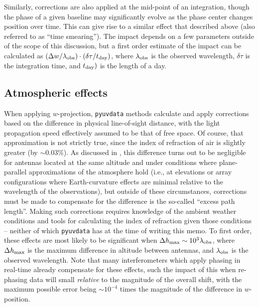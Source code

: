 \documentclass[11pt, oneside]{article}
\begin{document}
Similarly, corrections are also applied at the mid-point of an integration, though the phase of a given baseline may significantly evolve as the phase center changes position over time. This can give rise to a similar effect that described above (also referred to as ``time smearing''). The impact depends on a few parameters outside of the scope of this discussion, but a first order estimate of the impact can be calculated as $(\Delta w / \lambda_{\rm obs}) \cdot (\delta\tau / t_{\rm day})$, where $\lambda_{\rm obs}$ is the observed wavelength, $\delta\tau$ is the integration time, and $t_{\rm day})$ is the length of a day.

\subsection{Atmospheric effects}
When applying $w$-projection, \texttt{pyuvdata} methods calculate and apply corrections based on the difference in physical line-of-sight distance, with the light propagation speed effectively assumed to be that of free space. Of course, that approximation is not strictly true, since the index of refraction of air is slightly greater (by $\sim0.03\%$). As discussed in \cite{TMS}, this difference turns out to be negligible for antennas located at the same altitude and under conditions where plane-parallel approximations of the atmosphere hold (i.e., at elevations or array configurations where Earth-curvature effects are minimal relative to the wavelength of the observations), but outside of these circumstances, corrections must be made to compensate for the difference is the so-called ``excess path length''. Making such corrections requires knowledge of the ambient weather conditions and tools for calculating the index of refraction given those conditions -- neither of which \texttt{pyuvdata} has at the time of writing this memo. To first order, these effects are most likely to be significant when $\Delta h_{\rm max}\sim10^{3}\lambda_{\rm obs}$, where $\Delta h_{\rm max}$ is the maximum difference in altitude between antennas, and $\lambda_{\rm obs}$ is the observed wavelength. Note that many interferometers which apply phasing in real-time already compensate for these effects, such the impact of this when re-phasing data will small \emph{relative} to the magnitude of the overall shift, with the maximum possible error being $\sim10^{-4}$ times the magnitude of the difference in $w$-position.
\end{document}
